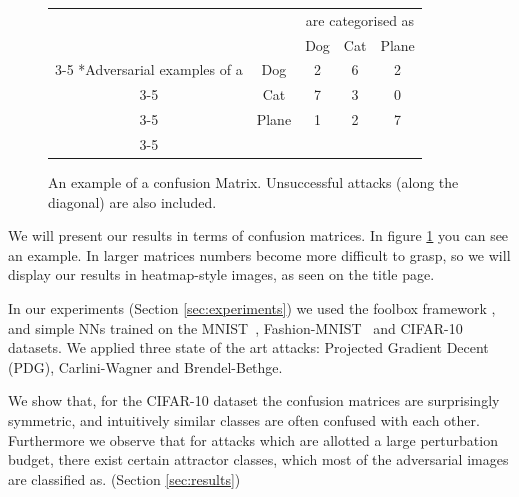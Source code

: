\documentclass{article}
\begin{document}
\begin{figure}[h]
	\begin{tabular}{cc|c|c|c|}
		& \multicolumn{1}{c}{} & \multicolumn{3}{c}{are categorised as}\\
		& \multicolumn{1}{c}{} & \multicolumn{1}{c}{Dog}  & \multicolumn{1}{c}{Cat} & \multicolumn{1}{c}{Plane} \\\cline{3-5}
		\multirow{3}*{Adversarial examples of a}  & Dog & 2 & 6 & 2\\\cline{3-5}
		& Cat & 7 & 3 &  0 \\\cline{3-5}
		& Plane & 1 & 2 &  7 \\\cline{3-5}
	\end{tabular}
	
	\caption{An example of a confusion Matrix. Unsuccessful attacks (along the diagonal) are also included.}
	\label{fig:matrixexample}
\end{figure}

We will present our results in terms of confusion matrices. In figure \ref{fig:matrixexample} you can see an example. In larger matrices numbers become more difficult to grasp, so we will display our results in heatmap-style images, as seen on the title page.

In our experiments (Section \ref{sec:experiments}) we used the foolbox framework \cite{rauber2017foolbox}, and simple NNs trained on the MNIST~\cite{deng2012mnist}, Fashion-MNIST~\cite{deng2012mnist} and CIFAR-10~\cite{krizhevsky2009learning} datasets. We applied three state of the art attacks: Projected Gradient Decent (PDG)\cite{madry2017towards}, Carlini-Wagner \cite{carlini2017towards} and Brendel-Bethge\cite{brendel2019accurate}. 

We show that, for the CIFAR-10 dataset the confusion matrices are surprisingly symmetric, and intuitively similar classes are often confused with each other. Furthermore we observe that for attacks which are allotted a large perturbation budget, there exist certain attractor classes, which most of the adversarial images are classified as. (Section \ref{sec:results})

%
\end{document}
